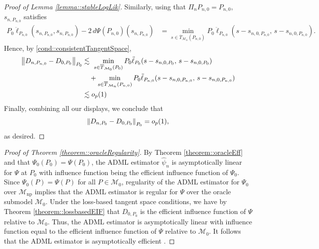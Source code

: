 \documentclass[11pt]{article}
\theoremstyle{definition}
\begin{document}
\begin{proof}[Proof of Lemma \ref{lemma::stableLogLik}]
Similarly,  using that $\Pi_n P_{n,0} = P_{n,0}$, $s_{n,P_{n,0}}$ satisfies
\begin{align*}
 P_0\ddot{\ell}_{P_{n,0}}(s_{n,P_{n,0}},s_{n,P_{n,0}}) - 2\, d\Psi(P_{n,0})(s_{n,P_{n,0}}) 
   &= \min_{s \in \overline{T}_{\mathcal{M}_n}(P_{n,0})} P_0\ddot{\ell}_{P_{n,0}}(s - s_{n,0,P_{n,0}},\, s - s_{n,0,P_{n,0}}).
\end{align*}
Hence, by \eqref{cond::consistentTangentSpace},
\begin{align*}
    \norm{D_{n,P_{n,0}} - D_{0,P_{0}}}_{P_0}
    &\lesssim\ \min_{s \in \overline{T}_{\mathcal{M}_0}(P_0)} P_0\ddot{\ell}_{P_0}(s - s_{n,0,P_0},\, s - s_{n,0,P_0}) \\
    &\quad + \min_{s \in \overline{T}_{\mathcal{M}_n}(P_{n,0})} P_0\ddot{\ell}_{P_{n,0}}(s - s_{n,0,P_{n,0}},\, s - s_{n,0,P_{n,0}})\\
     &\lesssim o_p(1)
\end{align*}
Finally, combining all our displays, we conclude that
\begin{align*}
    \norm{D_{n,P_0} - D_{0,P_0}}_{P_0} = o_p(1),
\end{align*}
as desired.

 
\end{proof}





\begin{proof}[Proof of Theorem \ref{theorem::oracleRegularity}]
    By Theorem \ref{theorem::oracleEff} and that $\Psi_0(P_0) = \Psi(P_0)$, the ADML estimator $\widehat{\psi}_n$ is asymptotically linear for $\Psi$ at $P_0$ with influence function being the efficient influence function of $\Psi_0$. Since $\Psi_0(P) = \Psi(P)$ for all $P \in \mathcal{M}_0$, regularity of the ADML estimator for $\Psi_0$ over $\mathcal{M}_{\mathrm{np}}$ implies that the ADML estimator is regular for $\Psi$ over the oracle submodel $\mathcal{M}_0$. Under the loss-based tangent space conditions, we have by Theorem \ref{theorem::lossbasedEIF} that $D_{0,P_0}$ is the efficient influence function of $\Psi$ relative to $\mathcal{M}_0$. Thus, the ADML estimator is asymptotically linear with influence function equal to the efficient influence function of $\Psi$ relative to $\mathcal{M}_0$. It follows that the ADML estimator is asymptotically efficient \citep{vandervaart2000asymptotic}.\end{proof}
\end{document}
